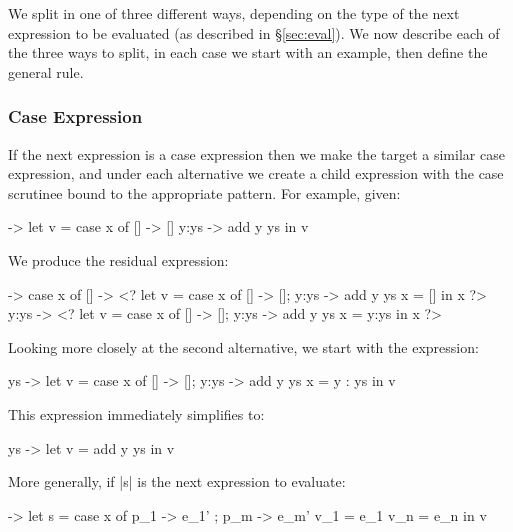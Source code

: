 \documentclass[draft]{sigplanconf}
\begin{document}
\smallskip
We split in one of three different ways, depending on the type of the next expression to be evaluated (as described in \S\ref{sec:eval}). We now describe each of the three ways to split, in each case we start with an example, then define the general rule.

\subsubsection{Case Expression}
\label{sec:eval_split_case}

If the next expression is a case expression then we make the target a similar case expression, and under each alternative we create a child expression with the case scrutinee bound to the appropriate pattern. For example, given:

\begin{code}
\x ->  let   v = case  x of
                       []    -> []
                       y:ys  -> add y ys
       in    v
\end{code}

\noindent We produce the residual expression:

\begin{code}
\x ->  case x of
       []    -> <?  let  v =  case x of [] -> []; y:ys -> add y ys
                         x =  []
                    in   x ?>
       y:ys  -> <?  let  v =  case x of [] -> []; y:ys -> add y ys
                         x =  y:ys
                    in   x ?>
\end{code}

Looking more closely at the second alternative, we start with the expression:

\begin{code}
\y ys ->  let  v  = case x of [] -> []; y:ys -> add y ys
               x  = y : ys
          in   v
\end{code}

\noindent This expression immediately simplifies to:

\begin{code}
\y ys ->  let  v = add y ys
          in   v
\end{code}

More generally, if |s| is the next expression to evaluate:

\begin{code}
\free ->  let  s    = case x of p_1 -> e_1' ; p_m -> e_m'
               v_1  = e_1
               v_n  = e_n
          in   v
\end{code}
\end{document}
